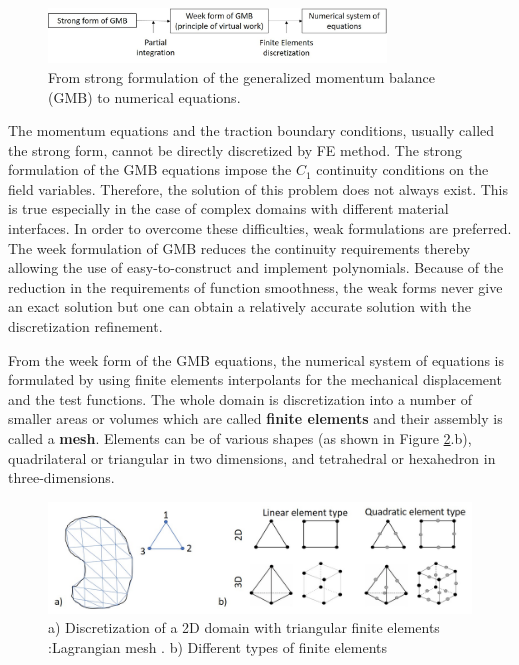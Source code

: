 \begin{figure}[!h]
\centering
\includegraphics[width=0.8\textwidth,keepaspectratio]{figures/fe_method.jpg}
\caption{From strong formulation of the generalized momentum balance (GMB) to numerical equations.}
\label{fe_method}
\end{figure}




 The momentum equations and the traction boundary conditions, usually called the strong form, cannot be directly discretized by FE method. The strong formulation of the GMB equations impose the $C_1$ continuity conditions on the field variables. Therefore, the solution of this problem does not always exist. This is true especially in the case of complex domains with different material interfaces. In order to overcome these difficulties, weak formulations are preferred. The week formulation of GMB reduces the continuity requirements thereby allowing the use of easy-to-construct and implement polynomials. Because of the reduction in the requirements of function smoothness, the weak forms never give an exact solution but one can obtain a relatively accurate solution with the discretization refinement.



From the week form of the GMB equations, the numerical system of equations is formulated by using finite elements interpolants for the mechanical displacement and the test functions.   The whole domain is discretization into a number of smaller areas or volumes which are called \textbf{finite elements} and their assembly is called a\textbf{ mesh}. Elements can be of various shapes (as shown in Figure \ref{discretization}.b),  quadrilateral or triangular in two dimensions, and tetrahedral or hexahedron in three-dimensions.


\begin{figure}[!h]
\centering
\includegraphics[width=1\textwidth,keepaspectratio]{figures/discretization.jpg} 
\caption{a) Discretization of  a 2D domain with triangular finite elements :Lagrangian mesh . b) Different types of finite elements}
\label{discretization}
\end{figure}

